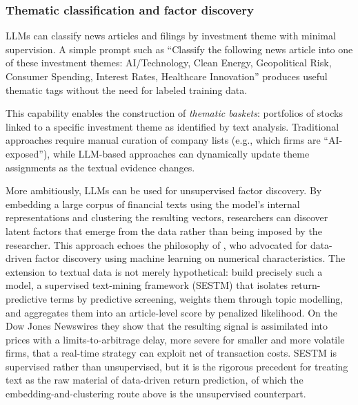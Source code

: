 \subsubsection{Thematic classification and factor discovery}

LLMs can classify news articles and filings by investment theme with minimal supervision. A simple prompt such as ``Classify the following news article into one of these investment themes: AI/Technology, Clean Energy, Geopolitical Risk, Consumer Spending, Interest Rates, Healthcare Innovation'' produces useful thematic tags without the need for labeled training data.

This capability enables the construction of \textit{thematic baskets}: portfolios of stocks linked to a specific investment theme as identified by text analysis. Traditional approaches require manual curation of company lists (e.g., which firms are ``AI-exposed''), while LLM-based approaches can dynamically update theme assignments as the textual evidence changes.

More ambitiously, LLMs can be used for unsupervised factor discovery. By embedding a large corpus of financial texts using the model's internal representations and clustering the resulting vectors, researchers can discover latent factors that emerge from the data rather than being imposed by the researcher. This approach echoes the philosophy of \cite{gu2018empirical}, who advocated for data-driven factor discovery using machine learning on numerical characteristics. The extension to textual data is not merely hypothetical: \cite{ke2019predicting} build precisely such a model, a supervised text-mining framework (SESTM) that isolates return-predictive terms by predictive screening, weights them through topic modelling, and aggregates them into an article-level score by penalized likelihood. On the Dow Jones Newswires they show that the resulting signal is assimilated into prices with a limits-to-arbitrage delay, more severe for smaller and more volatile firms, that a real-time strategy can exploit net of transaction costs. SESTM is supervised rather than unsupervised, but it is the rigorous precedent for treating text as the raw material of data-driven return prediction, of which the embedding-and-clustering route above is the unsupervised counterpart.

